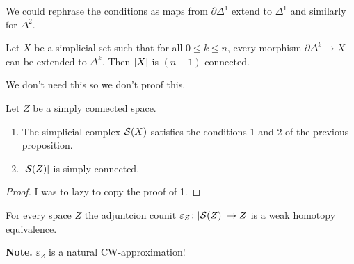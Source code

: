 \documentclass[language=english]{TemplateLecture}
\begin{document}
We could rephrase the conditions as maps from \(\partial\Delta^1\) extend to \(\Delta^1\) and similarly for \(\Delta^2\).

\begin{proposition}
    Let \(X\) be a simplicial set such that for all \(0 \leq k \leq n\), every morphism \(\partial \Delta^k \to X\) can be extended to \(\Delta^k\). Then \(\lvert X\rvert\) is \((n-1)\) connected.
\end{proposition}

We don't need this so we don't proof this.

\begin{corollary}
    Let \(Z\) be a simply connected space.
    \begin{enumerate}
        \item The simplicial complex \(\mathcal{S}(X)\) satisfies the conditions 1 and 2 of the previous proposition.
        \item \(\lvert\mathcal{S}(Z)\rvert\) is simply connected.
    \end{enumerate}
\end{corollary}

\begin{proof}
    I was to lazy to copy the proof of 1.
\end{proof}

\begin{thm}{}{}
    For every space \(Z\) the adjuntcion counit \(\varepsilon_Z\colon \lvert\mathcal{S}(Z)\rvert\to Z\) is a weak homotopy equivalence.
\end{thm}

\textbf{Note.} \(\varepsilon_Z\) is a natural CW-approximation!
\end{document}
